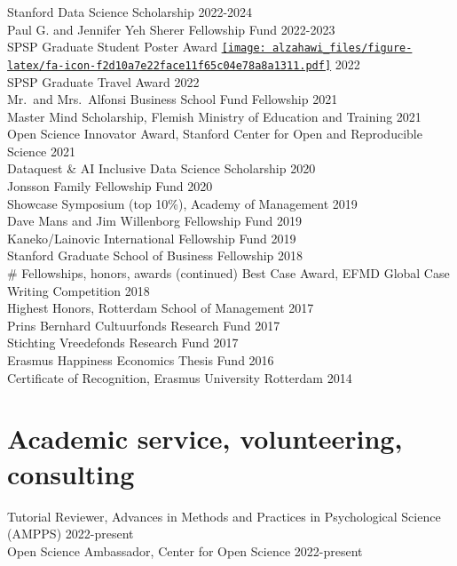 \documentclass[11pt,a4paper,]{awesome-cv}
\begin{document}
Stanford Data Science Scholarship \hfill 2022-2024\\
Paul G. and Jennifer Yeh Sherer Fellowship Fund \hfill 2022-2023\\
SPSP Graduate Student Poster Award
\href{http://bit.ly/crowd-poster}{\texttt{[image: alzahawi\_files/figure-latex/fa-icon-f2d10a7e22face11f65c04e78a8a1311.pdf]}}
\hfill 2022\\
SPSP Graduate Travel Award \hfill 2022\\
Mr.~and Mrs.~Alfonsi Business School Fund Fellowship \hfill 2021\\
Master Mind Scholarship, Flemish Ministry of Education and Training
\hfill 2021\\
Open Science Innovator Award, Stanford Center for Open and Reproducible
Science \hfill 2021\\
Dataquest \& AI Inclusive Data Science Scholarship \hfill 2020\\
Jonsson Family Fellowship Fund \hfill 2020\\
Showcase Symposium (top 10\%), Academy of Management \hfill 2019\\
Dave Mans and Jim Willenborg Fellowship Fund \hfill 2019\\
Kaneko/Lainovic International Fellowship Fund \hfill 2019\\
Stanford Graduate School of Business Fellowship \hfill 2018\\
\# Fellowships, honors, awards (continued) Best Case Award, EFMD Global
Case Writing Competition \hfill 2018\\
Highest Honors, Rotterdam School of Management \hfill 2017\\
Prins Bernhard Cultuurfonds Research Fund \hfill 2017\\
Stichting Vreedefonds Research Fund \hfill 2017\\
Erasmus Happiness Economics Thesis Fund \hfill 2016\\
Certificate of Recognition, Erasmus University Rotterdam \hfill 2014

\hypertarget{academic-service-volunteering-consulting}{%
\section{Academic service, volunteering,
consulting}\label{academic-service-volunteering-consulting}}

Tutorial Reviewer, Advances in Methods and Practices in Psychological
Science (AMPPS) \hfill 2022-present\\
Open Science Ambassador, Center for Open Science \hfill 2022-present
\end{document}
